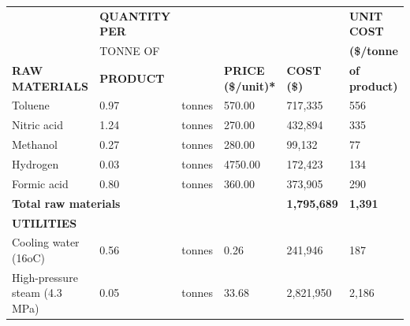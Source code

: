 \begin{table}[H]
\begin{tabular}{@{}llllll@{}}
                              & \textbf{QUANTITY PER} &                                       &                           &                            & \textbf{UNIT COST}   \\
                              & TONNE OF              &                                       &                           &                            & \textbf{(\$/tonne}   \\
\textbf{RAW MATERIALS}        & \textbf{PRODUCT}      & \textbf{}                             & \textbf{PRICE (\$/unit)*} & \textbf{COST (\$)}         & \textbf{of product)} \\ \cline{1-1}
Toluene                       & 0.97                  & tonnes                                & 570.00                    & 717,335                    & 556                  \\
Nitric acid                   & 1.24                  & tonnes                                & 270.00                    & 432,894                    & 335                  \\
Methanol                      & 0.27                  & tonnes                                & 280.00                    & 99,132                     & 77                   \\
Hydrogen                      & 0.03                  & tonnes                                & 4750.00                   & 172,423                    & 134                  \\
Formic acid                   & 0.80                  & tonnes                                & 360.00                    & 373,905                    & 290                  \\ \cline{5-6} 
\multicolumn{4}{l}{\textbf{Total raw materials}}                                                                          & \textbf{1,795,689}         & \textbf{1,391}       \\
\textbf{UTILITIES}            &                       &                                       &                           & \textbf{}                  &                      \\ \cline{1-1}
Cooling water (16oC)          & 0.56                  & tonnes                                & 0.26                      & 241,946                    & 187                  \\
High-pressure steam (4.3 MPa) & 0.05                  & tonnes                                & 33.68                     & 2,821,950                  & 2,186                \\

\end{tabular}
\end{table}
